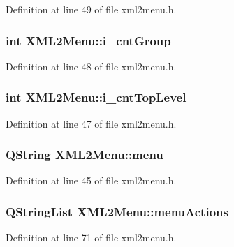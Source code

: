 Definition at line 49 of file xml2menu.h.

\hypertarget{classXML2Menu_ab96b42cd1ca2941ad73f3d495f25f5c5}{
\subsubsection[{i\_\-cntGroup}]{\setlength{\rightskip}{0pt plus 5cm}int {\bf XML2Menu::i\_\-cntGroup}}}
\label{classXML2Menu_ab96b42cd1ca2941ad73f3d495f25f5c5}


Definition at line 48 of file xml2menu.h.

\hypertarget{classXML2Menu_aef8a9bf7f7392284a21ff6d32172fb0a}{
\subsubsection[{i\_\-cntTopLevel}]{\setlength{\rightskip}{0pt plus 5cm}int {\bf XML2Menu::i\_\-cntTopLevel}}}
\label{classXML2Menu_aef8a9bf7f7392284a21ff6d32172fb0a}


Definition at line 47 of file xml2menu.h.

\hypertarget{classXML2Menu_a5d7d43cf678fa24fb1d41cdd046386c5}{
\subsubsection[{menu}]{\setlength{\rightskip}{0pt plus 5cm}QString {\bf XML2Menu::menu}}}
\label{classXML2Menu_a5d7d43cf678fa24fb1d41cdd046386c5}


Definition at line 45 of file xml2menu.h.

\hypertarget{classXML2Menu_a6358d28b430761cd31987607d583af39}{
\subsubsection[{menuActions}]{\setlength{\rightskip}{0pt plus 5cm}QStringList {\bf XML2Menu::menuActions}}}
\label{classXML2Menu_a6358d28b430761cd31987607d583af39}


Definition at line 71 of file xml2menu.h.

